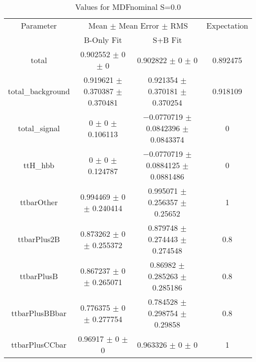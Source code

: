 \begin{table}
\centering
\caption{Values for MDFnominal S=0.0}
\begin{tabular}{cccc}
\toprule
Parameter & \multicolumn{2}{c}{Mean $\pm$ Mean Error $\pm$ RMS} & Expectation\\
 & B-Only Fit & S+B Fit & \\
\midrule
total & \num{0.902552} $\pm$ \num{0} $\pm$ \num{0} & \num{0.902822} $\pm$ \num{0} $\pm$ \num{0} & \num{0.892475}\\
total\_background & \num{0.919621} $\pm$ \num{0.370387} $\pm$ \num{0.370481} & \num{0.921354} $\pm$ \num{0.370181} $\pm$ \num{0.370254} & \num{0.918109}\\
total\_signal & \num{0} $\pm$ \num{0} $\pm$ \num{0.106113} & \num{-0.0770719} $\pm$ \num{0.0842396} $\pm$ \num{0.0843374} & \num{0}\\
ttH\_hbb & \num{0} $\pm$ \num{0} $\pm$ \num{0.124787} & \num{-0.0770719} $\pm$ \num{0.0884125} $\pm$ \num{0.0881486} & \num{0}\\
ttbarOther & \num{0.994469} $\pm$ \num{0} $\pm$ \num{0.240414} & \num{0.995071} $\pm$ \num{0.256357} $\pm$ \num{0.25652} & \num{1}\\
ttbarPlus2B & \num{0.873262} $\pm$ \num{0} $\pm$ \num{0.255372} & \num{0.879748} $\pm$ \num{0.274443} $\pm$ \num{0.274548} & \num{0.8}\\
ttbarPlusB & \num{0.867237} $\pm$ \num{0} $\pm$ \num{0.265071} & \num{0.86982} $\pm$ \num{0.285263} $\pm$ \num{0.285186} & \num{0.8}\\
ttbarPlusBBbar & \num{0.776375} $\pm$ \num{0} $\pm$ \num{0.277754} & \num{0.784528} $\pm$ \num{0.298754} $\pm$ \num{0.29858} & \num{0.8}\\
ttbarPlusCCbar & \num{0.96917} $\pm$ \num{0} $\pm$ \num{0} & \num{0.963326} $\pm$ \num{0} $\pm$ \num{0} & \num{1}\\
\bottomrule
\end{tabular}
\end{table}